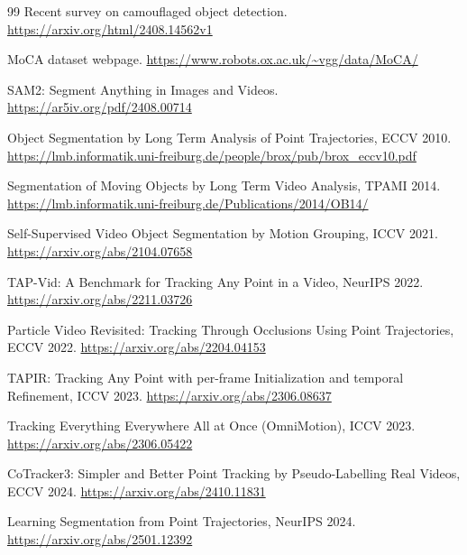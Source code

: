 \documentclass[11pt]{article}
\begin{document}
\begin{thebibliography}{99}
Recent survey on camouflaged object detection.\newline
\url{https://arxiv.org/html/2408.14562v1}

MoCA dataset webpage.\newline
\url{https://www.robots.ox.ac.uk/~vgg/data/MoCA/}

SAM2: Segment Anything in Images and Videos.\newline
\url{https://ar5iv.org/pdf/2408.00714}

Object Segmentation by Long Term Analysis of Point Trajectories, ECCV 2010.\newline
\url{https://lmb.informatik.uni-freiburg.de/people/brox/pub/brox_eccv10.pdf}

Segmentation of Moving Objects by Long Term Video Analysis, TPAMI 2014.\newline
\url{https://lmb.informatik.uni-freiburg.de/Publications/2014/OB14/}

Self-Supervised Video Object Segmentation by Motion Grouping, ICCV 2021.\newline
\url{https://arxiv.org/abs/2104.07658}

TAP-Vid: A Benchmark for Tracking Any Point in a Video, NeurIPS 2022.\newline
\url{https://arxiv.org/abs/2211.03726}

Particle Video Revisited: Tracking Through Occlusions Using Point Trajectories, ECCV 2022.\newline
\url{https://arxiv.org/abs/2204.04153}

TAPIR: Tracking Any Point with per-frame Initialization and temporal Refinement, ICCV 2023.\newline
\url{https://arxiv.org/abs/2306.08637}

Tracking Everything Everywhere All at Once (OmniMotion), ICCV 2023.\newline
\url{https://arxiv.org/abs/2306.05422}

CoTracker3: Simpler and Better Point Tracking by Pseudo-Labelling Real Videos, ECCV 2024.\newline
\url{https://arxiv.org/abs/2410.11831}

Learning Segmentation from Point Trajectories, NeurIPS 2024.\newline
\url{https://arxiv.org/abs/2501.12392}


\end{thebibliography}
\end{document}
